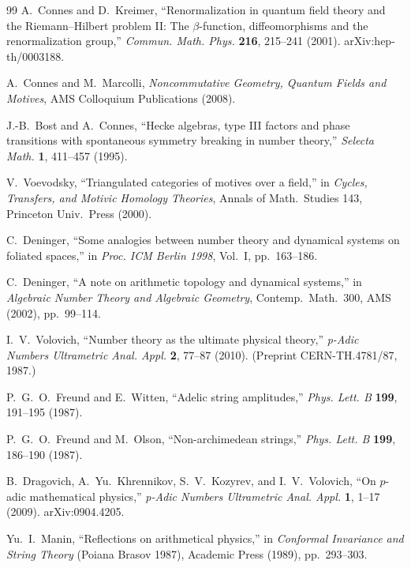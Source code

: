 \documentclass[12pt,a4paper]{ltjsarticle}
\theoremstyle{definition}
\begin{document}
\begin{thebibliography}{99}
A.~Connes and D.~Kreimer, ``Renormalization in quantum field theory and the Riemann--Hilbert problem II: The $\beta$-function, diffeomorphisms and the renormalization group,'' \textit{Commun. Math. Phys.} \textbf{216}, 215--241 (2001). arXiv:hep-th/0003188.

A.~Connes and M.~Marcolli, \textit{Noncommutative Geometry, Quantum Fields and Motives}, AMS Colloquium Publications (2008).

J.-B.~Bost and A.~Connes, ``Hecke algebras, type III factors and phase transitions with spontaneous symmetry breaking in number theory,'' \textit{Selecta Math.} \textbf{1}, 411--457 (1995).

V.~Voevodsky, ``Triangulated categories of motives over a field,'' in \textit{Cycles, Transfers, and Motivic Homology Theories}, Annals of Math.~Studies 143, Princeton Univ.~Press (2000).

C.~Deninger, ``Some analogies between number theory and dynamical systems on foliated spaces,'' in \textit{Proc. ICM Berlin 1998}, Vol.~I, pp.~163--186.

C.~Deninger, ``A note on arithmetic topology and dynamical systems,'' in \textit{Algebraic Number Theory and Algebraic Geometry}, Contemp.~Math.~300, AMS (2002), pp.~99--114.

I.~V.~Volovich, ``Number theory as the ultimate physical theory,'' \textit{p-Adic Numbers Ultrametric Anal. Appl.} \textbf{2}, 77--87 (2010). (Preprint CERN-TH.4781/87, 1987.)

P.~G.~O.~Freund and E.~Witten, ``Adelic string amplitudes,'' \textit{Phys. Lett. B} \textbf{199}, 191--195 (1987).

P.~G.~O.~Freund and M.~Olson, ``Non-archimedean strings,'' \textit{Phys. Lett. B} \textbf{199}, 186--190 (1987).

B.~Dragovich, A.~Yu.~Khrennikov, S.~V.~Kozyrev, and I.~V.~Volovich, ``On $p$-adic mathematical physics,'' \textit{p-Adic Numbers Ultrametric Anal. Appl.} \textbf{1}, 1--17 (2009). arXiv:0904.4205.

Yu.~I.~Manin, ``Reflections on arithmetical physics,'' in \textit{Conformal Invariance and String Theory} (Poiana Brasov 1987), Academic Press (1989), pp.~293--303.


\end{thebibliography}
\end{document}
